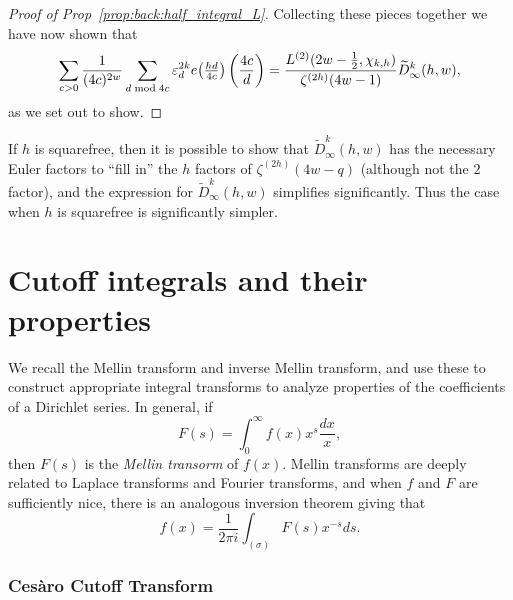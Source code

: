 \begin{proof}[Proof of Prop~\ref{prop:back:half_integral_L}]
  Collecting these pieces together we have now shown that
  \begin{equation}
    \sum_{c > 0} \frac{1}{(4c)^{2w}} \sum_{d \bmod 4c} \varepsilon_d^{2k} e \big( \tfrac{hd}{4c} \big) \left(\frac{4c}{d}\right)
    =
    \frac{L^{(2)} (2w - \frac{1}{2}, \chi_{k,h})}{\zeta^{(2h)}(4w-1)}
    \widetilde{D}_\infty^k(h,w),
  \end{equation}
  as we set out to show.
%
\end{proof}


\begin{remark}
  If $h$ is squarefree, then it is possible to show that $\widetilde{D}_\infty^k(h,w)$ has
  the necessary Euler factors to ``fill in'' the $h$ factors of $\zeta^{(2h)}(4w - q)$
  (although not the $2$ factor), and the expression for $\widetilde{D}_\infty^k(h,w)$
  simplifies significantly.
  Thus the case when $h$ is squarefree is significantly simpler.
\end{remark}



\section{Cutoff integrals and their properties}\label{sec:cutoff_integrals}


We recall the Mellin transform and inverse Mellin transform, and use these to construct
appropriate integral transforms to analyze properties of the coefficients of a Dirichlet
series.
In general, if
\begin{equation}
  F(s) = \int_0^\infty f(x) x^s \frac{dx}{x},
\end{equation}
then $F(s)$ is the \emph{Mellin transorm} of $f(x)$.
Mellin transforms are deeply related to Laplace transforms and Fourier transforms, and
when $f$ and $F$ are sufficiently nice, there is an analogous inversion theorem giving
that
\begin{equation}
  f(x) = \frac{1}{2\pi i} \int_{(\sigma)} F(s) x^{-s} ds.
\end{equation}



\subsubsection*{Ces\`{a}ro Cutoff Transform}


